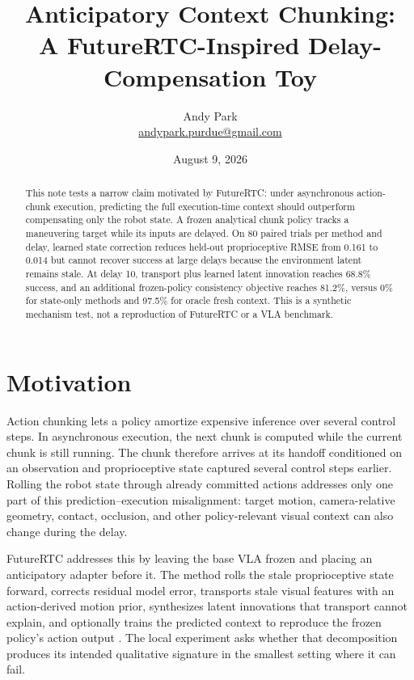 \documentclass[11pt]{article}
\title{Anticipatory Context Chunking:\\A FutureRTC-Inspired Delay-Compensation Toy}
\author{Andy Park\\\href{mailto:andypark.purdue@gmail.com}{andypark.purdue@gmail.com}}
\date{August 9, 2026}
\begin{document}
\maketitle

\begin{abstract}
This note tests a narrow claim motivated by FutureRTC: under asynchronous action-chunk execution, predicting the full execution-time context should outperform compensating only the robot state. A frozen analytical chunk policy tracks a maneuvering target while its inputs are delayed. On 80 paired trials per method and delay, learned state correction reduces held-out proprioceptive RMSE from 0.161 to 0.014 but cannot recover success at large delays because the environment latent remains stale. At delay 10, transport plus learned latent innovation reaches 68.8\% success, and an additional frozen-policy consistency objective reaches 81.2\%, versus 0\% for state-only methods and 97.5\% for oracle fresh context. This is a synthetic mechanism test, not a reproduction of FutureRTC or a VLA benchmark.
\end{abstract}

\section{Motivation}

Action chunking lets a policy amortize expensive inference over several control steps. In asynchronous execution, the next chunk is computed while the current chunk is still running. The chunk therefore arrives at its handoff conditioned on an observation and proprioceptive state captured several control steps earlier. Rolling the robot state through already committed actions addresses only one part of this prediction--execution misalignment: target motion, camera-relative geometry, contact, occlusion, and other policy-relevant visual context can also change during the delay.

FutureRTC addresses this by leaving the base VLA frozen and placing an anticipatory adapter before it. The method rolls the stale proprioceptive state forward, corrects residual model error, transports stale visual features with an action-derived motion prior, synthesizes latent innovations that transport cannot explain, and optionally trains the predicted context to reproduce the frozen policy's action output \cite{paper,project,code}. The local experiment asks whether that decomposition produces its intended qualitative signature in the smallest setting where it can fail.
\end{document}

